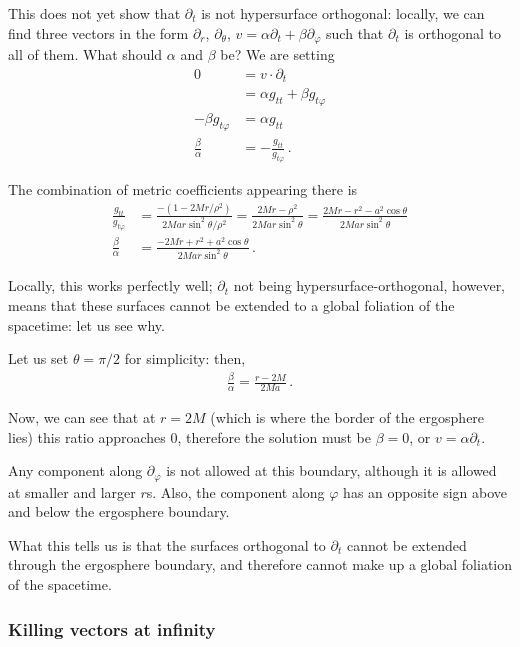 \documentclass[main.tex]{subfiles}
\begin{document}
This does not yet show that \(\partial_t\) is not hypersurface orthogonal: locally, we can find three vectors in the form \(\partial_r\), 
\(\partial_\theta \), \(v = \alpha \partial_t + \beta \partial_\varphi\) such that \(\partial_t\) is orthogonal to all of them. 
What should \(\alpha \) and \(\beta \) be? 
We are setting 
%
\begin{align}
0 &= v \cdot \partial_t \\
&= \alpha g_{tt} + \beta g_{t \varphi }  \\
- \beta g_{t \varphi } &= \alpha g_{tt}   \\
\frac{\beta }{\alpha} &= - \frac{ g_{t t }}{g_{t \varphi }}
\,.
\end{align}

The combination of metric coefficients appearing there is %
\begin{align}
\frac{g_{tt}}{g_{t \varphi }} &= 
\frac{- (1 - 2Mr / \rho^2)}{2Mar \sin^2 \theta / \rho^2} = \frac{2Mr - \rho^2}{2Mar \sin^2\theta } = \frac{2Mr - r^2 - a^2 \cos \theta }{2Mar \sin^2 \theta }  \\
\frac{\beta }{\alpha} &= \frac{ -2Mr + r^2 + a^2 \cos \theta}{2Mar \sin^2 \theta }
\,.
\end{align}

Locally, this works perfectly well; \(\partial_t\) not being hypersurface-orthogonal, however, 
means that these surfaces cannot be extended to a global foliation of the spacetime: let us see why. 

Let us set \(\theta = \pi /2\) for simplicity: then, 
%
\begin{align}
\frac{\beta }{\alpha} = \frac{r - 2M}{2Ma}
\,.
\end{align}

Now, we can see that at \(r = 2M\) (which is where the border of the ergosphere lies) this ratio approaches 0, therefore the 
solution must be \(\beta = 0\), or \(v = \alpha \partial_t\).

Any component along \(\partial_\varphi\) is not allowed at this boundary, although it is allowed at smaller and larger \(r\)s.
Also, the component along \(\varphi \) has an opposite sign above and below the ergosphere boundary. 

What this tells us is that the surfaces orthogonal to \(\partial_t\) cannot be extended through the ergosphere boundary, and therefore cannot make up a global foliation of the spacetime.

\subsubsection{Killing vectors at infinity}
\end{document}
